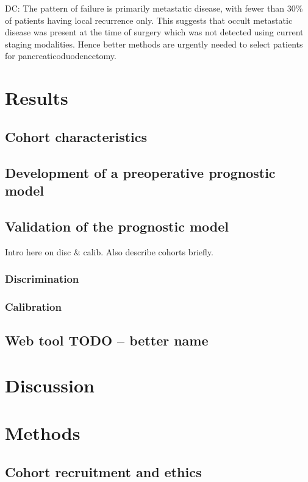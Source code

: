 \documentclass[dissertation.tex]{subfiles}
\begin{document}
DC: The pattern of failure is primarily metastatic disease, with fewer than 30\% of patients having local recurrence only. This suggests that occult metastatic disease was present at the time of surgery which was not detected using current staging modalities. Hence better methods are urgently needed to select patients for pancreaticoduodenectomy.

\section{Results}
\subsection{Cohort characteristics}
\label{subsec:nomo-results-cohort}

\subsection{Development of a preoperative prognostic model}

\subsection{Validation of the prognostic model}
Intro here on disc & calib.  Also describe cohorts briefly.
\subsubsection{Discrimination}
\subsubsection{Calibration}

\subsection{Web tool TODO -- better name}

\section{Discussion}

\section{Methods}
\subsection{Cohort recruitment and ethics}
\label{subsec:nomo-methods-cohort}
\end{document}
